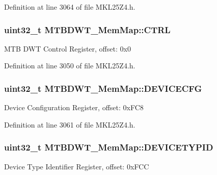Definition at line 3064 of file M\+K\+L25\+Z4.\+h.

\subsubsection[{\texorpdfstring{C\+T\+RL}{CTRL}}]{\setlength{\rightskip}{0pt plus 5cm}uint32\+\_\+t M\+T\+B\+D\+W\+T\+\_\+\+Mem\+Map\+::\+C\+T\+RL}\hypertarget{struct_m_t_b_d_w_t___mem_map_aba0d8163fee473f1b1a2a8528f49639c}{}\label{struct_m_t_b_d_w_t___mem_map_aba0d8163fee473f1b1a2a8528f49639c}
M\+TB D\+WT Control Register, offset\+: 0x0 

Definition at line 3050 of file M\+K\+L25\+Z4.\+h.

\subsubsection[{\texorpdfstring{D\+E\+V\+I\+C\+E\+C\+FG}{DEVICECFG}}]{\setlength{\rightskip}{0pt plus 5cm}uint32\+\_\+t M\+T\+B\+D\+W\+T\+\_\+\+Mem\+Map\+::\+D\+E\+V\+I\+C\+E\+C\+FG}\hypertarget{struct_m_t_b_d_w_t___mem_map_a836782ca35496627b905b98747e750c9}{}\label{struct_m_t_b_d_w_t___mem_map_a836782ca35496627b905b98747e750c9}
Device Configuration Register, offset\+: 0x\+F\+C8 

Definition at line 3061 of file M\+K\+L25\+Z4.\+h.

\subsubsection[{\texorpdfstring{D\+E\+V\+I\+C\+E\+T\+Y\+P\+ID}{DEVICETYPID}}]{\setlength{\rightskip}{0pt plus 5cm}uint32\+\_\+t M\+T\+B\+D\+W\+T\+\_\+\+Mem\+Map\+::\+D\+E\+V\+I\+C\+E\+T\+Y\+P\+ID}\hypertarget{struct_m_t_b_d_w_t___mem_map_a86a983ab8675b605e5769d98195ed8fd}{}\label{struct_m_t_b_d_w_t___mem_map_a86a983ab8675b605e5769d98195ed8fd}
Device Type Identifier Register, offset\+: 0x\+F\+CC 

